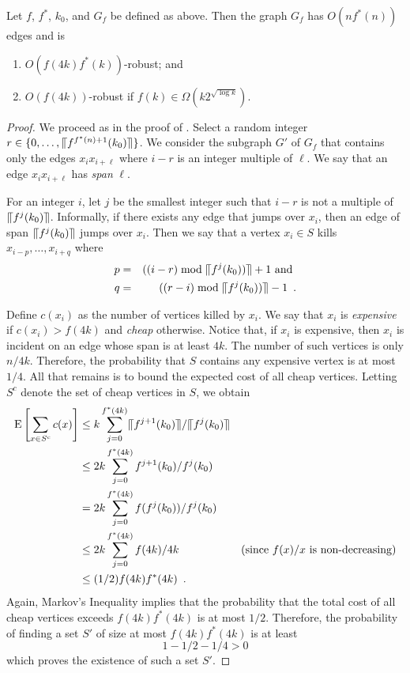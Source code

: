 \documentclass{patmorin}
\begin{document}
\begin{thm}
Let $f$, $f^*$, $k_0$, and $G_f$ be defined as above.  
Then the graph $G_f$ has $O(nf^*(n))$ edges and is
\begin{enumerate}
\item $O(f(4k)f^*(k))$-robust; and 
\item $O(f(4k))$-robust if $f(k)\in\Omega(k2^{\sqrt{\log k}})$.
\end{enumerate}
\end{thm}

\begin{proof}
We proceed as in the proof of .  Select a random integer
$r\in\{0,\ldots,\llceil f^{f^*(n)+1}(k_0)\rrceil\}$.  We consider the subgraph
$G'$ of $G_f$ that contains only the edges $x_ix_{i+\ell}$ where $i-r$
is an integer multiple of $\ell$.  We say that an edge $x_ix_{i+\ell}$
has \emph{span} $\ell$. 

For an integer $i$, let $j$ be the smallest integer such that $i-r$
is not a multiple of $\llceil f^j(k_0)\rrceil$.  Informally, if there exists any edge
that jumps over $x_i$, then an edge of span $\llceil f^j(k_0)\rrceil$ jumps over $x_i$.
Then we say that a vertex $x_i\in S$ kills $x_{i-p},\ldots,x_{i+q}$ where
\begin{eqnarray*}
   p&=& ((i-r) \bmod \llceil f^j(k_0))\rrceil+1 \text{ and } \\
   q&=& ((r-i) \bmod \llceil f^j(k_0))\rrceil-1 \enspace .
\end{eqnarray*}

Define $c(x_i)$ as the number of vertices killed by $x_i$.  We say that
$x_i$ is \emph{expensive} if $c(x_i) > f(4k)$ and \emph{cheap} otherwise.
Notice that, if $x_i$ is expensive, then $x_i$ is incident on an edge
whose span is at least $4k$.  The number of such vertices is only $n/4k$.
Therefore, the probability that $S$ contains any expensive vertex is
at most $1/4$.  All that remains is to bound the expected cost of all
cheap vertices. Letting $S^c$ denote the set of cheap vertices in $S$, we obtain
\begin{align*}
   \mathrm{E}\left[\sum_{x\in S^c} c(x)\right] 
    & \le  k \sum_{j=0}^{f^*(4k)} \llceil f^{j+1}(k_0)\rrceil/\llceil f^j(k_0)\rrceil \\
    & \le  2k \sum_{j=0}^{f^*(4k)} f^{j+1}(k_0)/f^j(k_0) \\
    & =  2k \sum_{j=0}^{f^*(4k)} f(f^{j}(k_0))/f^j(k_0) \\
    & \le  2k \sum_{j=0}^{f^*(4k)} f(4k)/4k & \text{(since $f(x)/x$ is non-decreasing)} \\
    & \le  (1/2)f(4k)f^*(4k) \enspace .
\end{align*}
Again, Markov's Inequality implies that the probability that the total cost of all cheap vertices exceeds $f(4k)f^*(4k)$ is at most $1/2$.  Therefore, the probability of finding a set $S'$ of size at most $f(4k)f^*(4k)$ is at least
\[  1 - 1/2 - 1/4 > 0 \]
which proves the existence of such a set $S'$.


\end{proof}
\end{document}
